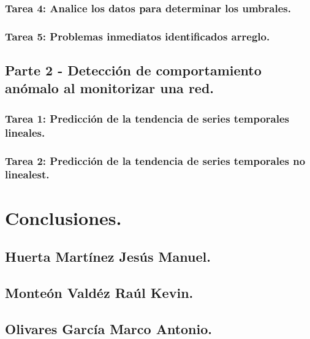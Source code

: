 \documentclass[oneside,10pt]{book}
\begin{document}
\subsection{Tarea 4: Analice los datos para determinar los umbrales.}

\subsection{Tarea 5: Problemas inmediatos identificados arreglo.}


\section{Parte 2 - Detección de comportamiento anómalo al monitorizar una red.}

\subsection{Tarea 1: Predicción de la tendencia de series temporales lineales.}

\subsection{Tarea 2: Predicción de la tendencia de series temporales no linealest.}


\chapter{Conclusiones.}

\section{Huerta Martínez Jesús Manuel.}

\section{Monteón Valdéz Raúl Kevin.}

\section{Olivares García Marco Antonio.}


	
\end{document}
